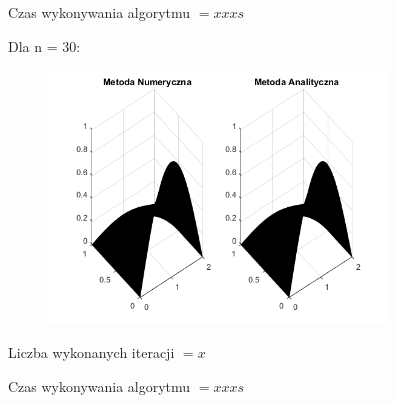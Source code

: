 Czas wykonywania algorytmu $ = xxx s$

Dla n = 30:

\begin{figure}[!ht]
	\begin{center}
		\includegraphics[width=0.8\textwidth]{Lab7/charts/rmb/100.png}
	\end{center}
\end{figure}

Liczba wykonanych iteracji $ = x $

Czas wykonywania algorytmu $ = xxx s$
